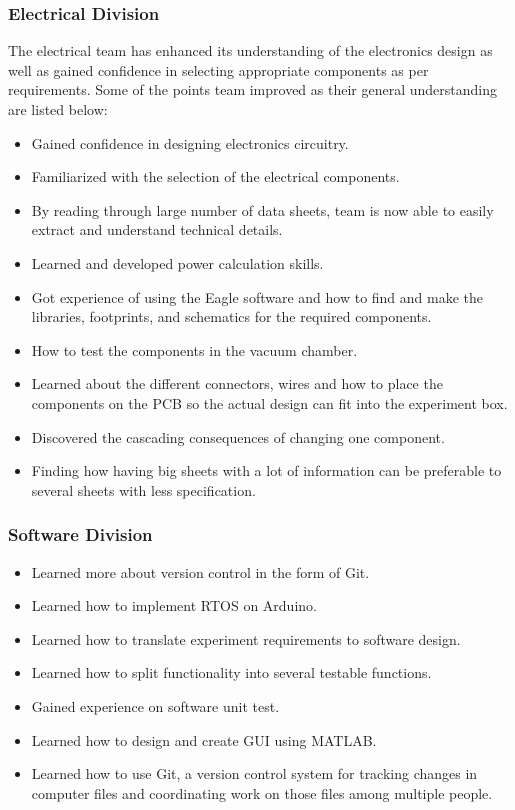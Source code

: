 \documentclass[a4paper,12pt,twoside]{article}
\begin{document}
\subsubsection{Electrical Division}
The electrical team has enhanced its understanding of the electronics design as well as gained confidence in selecting appropriate components as per requirements. Some of the points team improved as their general understanding are listed below:  
\begin{itemize}

    \item Gained confidence in designing electronics circuitry.
    \item Familiarized with the selection of the electrical components. 
    \item By reading through large number of data sheets, team is now able to easily extract and understand technical details. 
    \item Learned and developed power calculation skills.
    \item Got experience of using the Eagle software and how to find and make the libraries, footprints, and schematics for the required components.
    \item How to test the components in the vacuum chamber.
    \item Learned about the different connectors, wires and how to place the components on the PCB so the actual design can fit into the experiment box.
    \item Discovered the cascading consequences of changing one component.
    \item Finding how having big sheets with a lot of information can be preferable to several sheets with less specification.
\end{itemize}


\subsubsection{Software Division}

\begin{itemize}
    \item Learned more about version control in the form of Git.
    \item Learned how to implement RTOS on Arduino.
    \item Learned how to translate experiment requirements to software design.
    \item Learned how to split functionality into several testable functions.
    \item Gained experience on software unit test.
    \item Learned how to design and create GUI using MATLAB.
    \item Learned how to use Git, a version control system for tracking changes in computer files and coordinating work on those files among multiple people.
\end{itemize}
\end{document}
